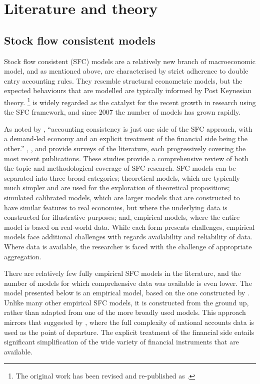 \documentclass[
]{book}
\begin{document}
\hypertarget{sec:fi-fl-sfc-lit}{%
\section{Literature and theory}\label{sec:fi-fl-sfc-lit}}

\hypertarget{stock-flow-consistent-models}{%
\subsection{Stock flow consistent models}\label{stock-flow-consistent-models}}

Stock flow consistent (SFC) models are a relatively new branch of macroeconomic model, and as mentioned above, are characterised by strict adherence to double entry accounting rules. They resemble structural econometric models, but the expected behaviours that are modelled are typically informed by Post Keynesian theory. \citet{godleylavoie2007}\footnote{The original work has been revised and re-published as \citet{godleylavoie2012}.} is widely regarded as the catalyst for the recent growth in research using the SFC framework, and since 2007 the number of models has grown rapidly.

As noted by \citet[pp.~3]{nikiforoszezza2017}, ``accounting consistency is just one side of the SFC approach, with a demand-led economy and an explicit treatment of the financial side being the other.'' \citet{dossantos2006}, \citet{caverzasi2013}, \citet{caverzasigodin2015} and \citet{nikiforoszezza2017} provide surveys of the literature, each progressively covering the most recent publications. These studies provide a comprehensive review of both the topic and methodological coverage of SFC research. SFC models can be separated into three broad categories; theoretical models, which are typically much simpler and are used for the exploration of theoretical propositions; simulated calibrated models, which are larger models that are constructed to have similar features to real economies, but where the underlying data is constructed for illustrative purposes; and, empirical models, where the entire model is based on real-world data. While each form presents challenges, empirical models face additional challenges with regards availability and reliability of data. Where data is available, the researcher is faced with the challenge of appropriate aggregation.

There are relatively few fully empirical SFC models in the literature, and the number of models for which comprehensive data was available is even lower. The model presented below is an empirical model, based on the one constructed by \citet{byrialsenraza2019empirical}. Unlike many other empirical SFC models, it is constructed from the ground up, rather than adapted from one of the more broadly used \citet{godleylavoie2012} models. This approach mirrors that suggested by \citet{zezza2019design}, where the full complexity of national accounts data is used as the point of departure. The explicit treatment of the financial side entails significant simplification of the wide variety of financial instruments that are available.
\end{document}
